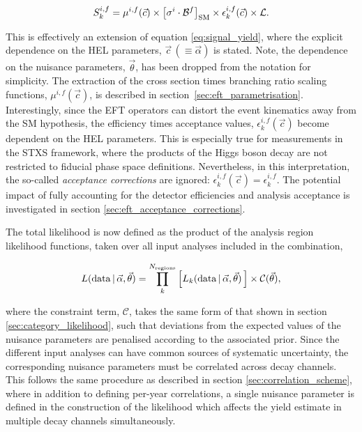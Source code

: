 \begin{equation}\label{eq:signal_yield_eft}
    S_k^{i,f} = \mu^{i,f}(\vec{c}) \times \big[\sigma^i \cdot \mathcal{B}^{f} \big]_{\rm{SM}} \times \epsilon^{i,f}_k(\vec{c}) \times \mathcal{L}.
\end{equation}

\noindent
This is effectively an extension of equation \ref{eq:signal_yield}, where the explicit dependence on the HEL parameters, $\vec{c}\,(\equiv\vec{\alpha})$ is stated. Note, the dependence on the nuisance parameters, $\vec{\theta}$, has been dropped from the notation for simplicity. The extraction of the cross section times branching ratio scaling functions, $\mu^{i,f}(\vec{c})$, is described in section~\ref{sec:eft_parametrisation}. Interestingly, since the EFT operators can distort the event kinematics away from the SM hypothesis, the efficiency times acceptance values, $\epsilon^{i,f}_k(\vec{c})$ become dependent on the HEL parameters. This is especially true for measurements in the STXS framework, where the products of the Higgs boson decay are not restricted to fiducial phase space definitions. Nevertheless, in this interpretation, the so-called \textit{acceptance corrections} are ignored: $\epsilon^{i,f}_k(\vec{c})=\epsilon^{i,f}_k$. The potential impact of fully accounting for the detector efficiencies and analysis acceptance is investigated in section \ref{sec:eft_acceptance_corrections}.

The total likelihood is now defined as the product of the analysis region likelihood functions, taken over all input analyses included in the combination,

\begin{equation}
    L({\rm{data}}\,|\,\vec{\alpha},\vec{\theta}) = \prod_{k}^{N_{\rm{regions}}} \Big[    L_k({\rm{data}}\,|\,\vec{\alpha},\vec{\theta}) \,\Big] \times \mathcal{C}(\vec{\theta}) ,
\end{equation}

\noindent
where the constraint term, $\mathcal{C}$, takes the same form of that shown in section \ref{sec:category_likelihood}, such that deviations from the expected values of the nuisance parameters are penalised according to the associated prior. Since the different input analyses can have common sources of systematic uncertainty, the corresponding nuisance parameters must be correlated across decay channels. This follows the same procedure as described in section \ref{sec:correlation_scheme}, where in addition to defining per-year correlations, a single nuisance parameter is defined in the construction of the likelihood which affects the yield estimate in multiple decay channels simultaneously. 

